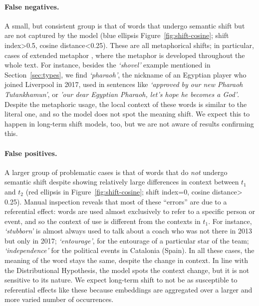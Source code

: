 \paragraph{False negatives.}
A small, but consistent group is that of %
words that undergo semantic shift but are not captured by the model
(blue ellipsis Figure~\ref{fig:shift-cosine}; shift index\textgreater 0.5, cosine distance\textless 0.25).
These are all metaphorical shifts; in particular, cases of extended
metaphor \cite{werth1994extended}, where the metaphor is 
developed throughout the whole text.
For instance, besides the {\em `shovel'} example mentioned in Section~\ref{sec:types}, we find {\em `pharaoh'}, the nickname of an Egyptian player who
joined Liverpool in 2017, used in
sentences like \textit{`approved by our new Pharaoh Tutankhamun'}, or \textit{'our dear Egyptian Pharaoh, let's hope he becomes a God'}.
Despite the metaphoric usage, the local context of these words is similar to the literal one, and so the model does not spot the meaning shift. We expect this to happen in long-term shift models, too, but we are not aware of results confirming this.

\paragraph{False positives.}
A larger group of problematic cases is that of %
words that do \textit{not} undergo semantic shift despite showing
relatively large differences in context between $t_1$ and $t_2$ (red ellipsis in
Figure~\ref{fig:shift-cosine}; shift index=0, cosine distance\textgreater	
0.25). Manual inspection reveals that most of these ``errors'' 
are due to a referential effect: words are used
almost exclusively to refer to a specific person or event, and
so the context of use is different from the contexts in $t_1$.
For instance, {\em `stubborn'} is
almost always used to talk about a coach who was not
there in 2013 but only in 2017; 
{\em `entourage'}, for the entourage of a particular star of the team; {\em `independence'} for the
political events in Catalonia (Spain). 
In all these cases, the meaning of the word stays the same, %
despite the change in context. In line with the Distributional
Hypothesis, the model spots the context change, but it is not
sensitive to its nature. We expect long-term shift to not be as
susceptible to referential effects 
like these because
embeddings are aggregated over a larger and more varied number of
occurrences.

